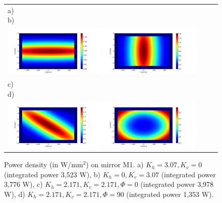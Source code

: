 \documentclass[preprint]{iucr}
\begin{document}
\begin{figure} 
\label{fig:M1powerdensity}
\begin{center}
\begin{tabular}{l} 
   a)~~~~~~~~~~~~~~~~~~~~~~~~~~~~~~~~~~~~~~~~~~~~
   b)~~~~~~~~~~~~~~~~~~~~~~~~~~~~~~~~~~~~~~~~~~~~\\
   \includegraphics[width=0.45\textwidth]{figures/powerdensityKv.png}
   \includegraphics[width=0.45\textwidth]{figures/powerdensityKh.png}\\
   c)~~~~~~~~~~~~~~~~~~~~~~~~~~~~~~~~~~~~~~~~~~~~
   d)~~~~~~~~~~~~~~~~~~~~~~~~~~~~~~~~~~~~~~~~~~~~\\
   \includegraphics[width=0.45\textwidth]{figures/powerdensityKhKv.png} 
      \includegraphics[width=0.45\textwidth]{figures/powerdensityKhKv90.png}
\end{tabular}
\end{center}
\caption
{Power density (in W/mm$^2$) on mirror M1.
a) $K_h=3.07, K_v=0$ (integrated power 3,523 W),
b) $K_h=0,K_v=3.07$ (integrated power 3,776 W),
c) $K_h=2.171,K_v=2.171, \Phi=0$ \textdegree (integrated power 3,978 W),
d) $K_h=2.171,K_v=2.171, \Phi=90$ \textdegree (integrated power 1,353 W).
}
\end{figure} 
\end{document}
